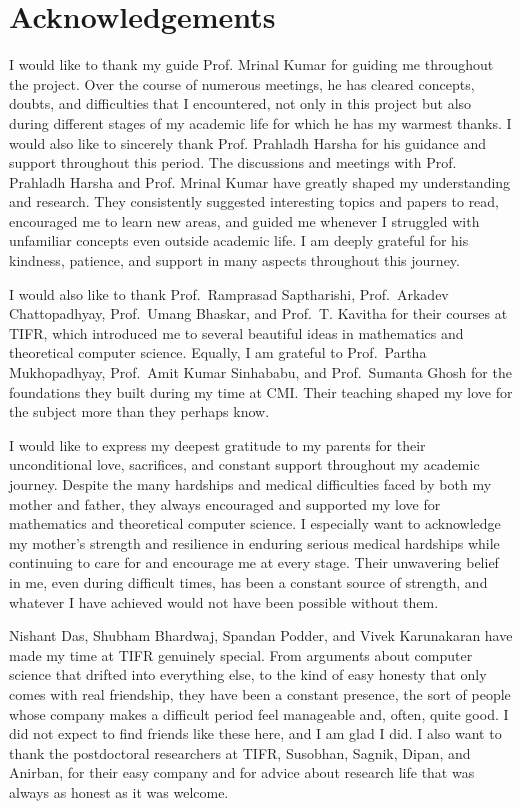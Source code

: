 \chapter*{Acknowledgements}
I would like to thank my guide Prof. Mrinal Kumar for guiding me throughout the project. Over the course of numerous meetings, he has cleared concepts, doubts, and difficulties that I encountered, not only in this project but also during different stages of my academic life for which he has my warmest thanks. I would also like to sincerely thank Prof. Prahladh Harsha for his guidance and support throughout this period. The discussions and meetings with Prof. Prahladh Harsha and Prof. Mrinal Kumar have greatly shaped my understanding and research. They consistently suggested interesting topics and papers to read, encouraged me to learn new areas, and guided me whenever I struggled with unfamiliar concepts even outside academic life. I am deeply grateful for his kindness, patience, and support in many aspects throughout this journey.

I would also like to thank Prof.\ Ramprasad Saptharishi, Prof.\ Arkadev Chattopadhyay, Prof.\ Umang Bhaskar, and Prof.\ T. Kavitha for their courses at TIFR, which introduced me to several beautiful ideas in mathematics and theoretical computer science. Equally, I am grateful to Prof.\ Partha Mukhopadhyay, Prof.\ Amit Kumar Sinhababu, and Prof.\ Sumanta Ghosh for the foundations they built during my time at CMI. Their teaching shaped my love for the subject more than they perhaps know.

I would like to express my deepest gratitude to my parents for their unconditional love, sacrifices, and constant support throughout my academic journey. Despite the many hardships and medical difficulties faced by both my mother and father, they always encouraged and supported my love for mathematics and theoretical computer science. I especially want to acknowledge my mother's strength and resilience in enduring serious medical hardships while continuing to care for and encourage me at every stage. Their unwavering belief in me, even during difficult times, has been a constant source of strength, and whatever I have achieved would not have been possible without them.

Nishant Das, Shubham Bhardwaj, Spandan Podder, and Vivek Karunakaran have made my time at TIFR genuinely special. From arguments about computer science that drifted into everything else, to the kind of easy honesty that only comes with real friendship, they have been a constant presence, the sort of people whose company makes a difficult period feel manageable and, often, quite good. I did not expect to find friends like these here, and I am glad I did. I also want to thank the postdoctoral researchers at TIFR, Susobhan, Sagnik, Dipan, and Anirban, for their easy company and for advice about research life that was always as honest as it was welcome.

